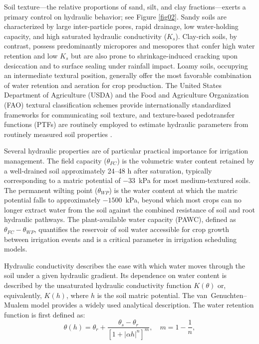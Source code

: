 \documentclass[land,review,accept,pdftex,oneauthor]{Definitions/mdpi}
\begin{document}
Soil texture---the relative proportions of sand, silt, and clay fractions---exerts a primary control on hydraulic behavior; see Figure \ref{fig02}. Sandy soils are characterized by large inter-particle pores, rapid drainage, low water-holding capacity, and high saturated hydraulic conductivity ($K_s$). Clay-rich soils, by contrast, possess predominantly micropores and mesopores that confer high water retention and low $K_s$ but are also prone to shrinkage-induced cracking upon desiccation and to surface sealing under rainfall impact. Loamy soils, occupying an intermediate textural position, generally offer the most favorable combination of water retention and aeration for crop production. The United States Department of Agriculture (USDA) and the Food and Agriculture Organization (FAO) textural classification schemes provide internationally standardized frameworks for communicating soil texture, and texture-based pedotransfer functions (PTFs) are routinely {employed to} estimate hydraulic parameters from routinely measured soil properties \citep{wosten2001pedotransfer,Lemenkova202302,Lemenkova202314}.


Several hydraulic properties are of particular practical importance for irrigation management. The field capacity ($\theta_{FC}$) is the volumetric water content retained by a well-drained soil approximately 24--48 h after saturation, typically corresponding to a matric potential of $-33$~kPa for most medium-textured soils. The permanent wilting point ($\theta_{WP}$) is the water content at which the matric potential falls to approximately $-1500$~kPa, beyond which most crops can no longer extract water from the soil against the combined resistance of soil and root hydraulic pathways. The plant-available water capacity (PAWC), defined as $\theta_{FC} - \theta_{WP}$, quantifies the reservoir of soil water accessible for crop growth between irrigation events and is a critical parameter in irrigation scheduling models.

Hydraulic conductivity describes the ease with which water moves through the soil under a given hydraulic gradient. Its dependence on water content is described by the unsaturated hydraulic conductivity function $K(\theta)$ or, equivalently, $K(h)$, where $h$ is the soil matric potential. The van~Genuchten--Mualem model \citep{vangenuchten1980closed} provides a widely used analytical description. {The water retention function is first defined as: %
}
{\begin{equation}
\theta(h) = \theta_r + \frac{\theta_s - \theta_r}{\left[1 + |\alpha h|^n\right]^m}, \quad m = 1 - \frac{1}{n},
\end{equation}}
\end{document}
